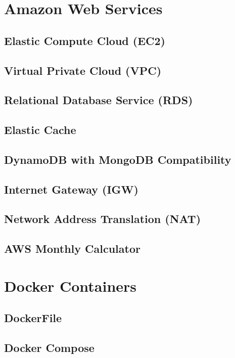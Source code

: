 
\section{Amazon Web Services}
\subsection{Elastic Compute Cloud (EC2)}
\subsection{Virtual Private Cloud (VPC)}
\subsection{Relational Database Service (RDS)}
\subsection{Elastic Cache}
\subsection{DynamoDB with MongoDB Compatibility}
\subsection{Internet Gateway (IGW)}
\subsection{Network Address Translation (NAT)}
\subsection{AWS Monthly Calculator}

\pagebreak
\section{Docker Containers}
\subsection{DockerFile}
\subsection{Docker Compose}